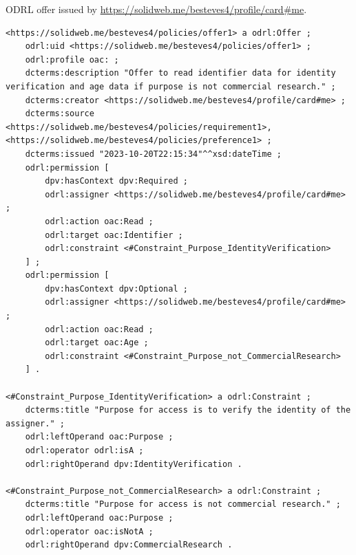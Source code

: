 \begin{listing}[htp]
\caption[ODRL Offer.]{ODRL offer issued by \url{https://solidweb.me/besteves4/profile/card\#me}.}
\label{list:oac_offer}
\begin{verbatim}
<https://solidweb.me/besteves4/policies/offer1> a odrl:Offer ;
    odrl:uid <https://solidweb.me/besteves4/policies/offer1> ;
    odrl:profile oac: ;
    dcterms:description "Offer to read identifier data for identity verification and age data if purpose is not commercial research." ;
    dcterms:creator <https://solidweb.me/besteves4/profile/card#me> ;
    dcterms:source <https://solidweb.me/besteves4/policies/requirement1>, <https://solidweb.me/besteves4/policies/preference1> ;
    dcterms:issued "2023-10-20T22:15:34"^^xsd:dateTime ;
    odrl:permission [
        dpv:hasContext dpv:Required ;
        odrl:assigner <https://solidweb.me/besteves4/profile/card#me> ;
        odrl:action oac:Read ;
        odrl:target oac:Identifier ;
        odrl:constraint <#Constraint_Purpose_IdentityVerification>
    ] ;
    odrl:permission [
        dpv:hasContext dpv:Optional ;
        odrl:assigner <https://solidweb.me/besteves4/profile/card#me> ;
        odrl:action oac:Read ;
        odrl:target oac:Age ;
        odrl:constraint <#Constraint_Purpose_not_CommercialResearch>
    ] .

<#Constraint_Purpose_IdentityVerification> a odrl:Constraint ;
    dcterms:title "Purpose for access is to verify the identity of the assigner." ;
    odrl:leftOperand oac:Purpose ;
    odrl:operator odrl:isA ;
    odrl:rightOperand dpv:IdentityVerification .

<#Constraint_Purpose_not_CommercialResearch> a odrl:Constraint ;
    dcterms:title "Purpose for access is not commercial research." ;
    odrl:leftOperand oac:Purpose ;
    odrl:operator oac:isNotA ;
    odrl:rightOperand dpv:CommercialResearch .
\end{verbatim}
\end{listing}

